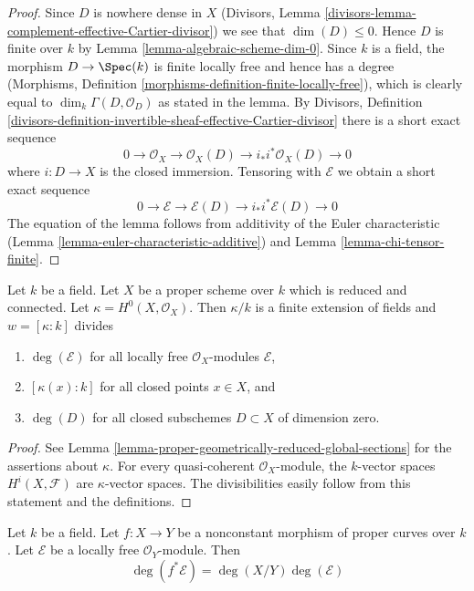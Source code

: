 \begin{proof}
Since $D$ is nowhere dense in $X$ (Divisors, Lemma
\ref{divisors-lemma-complement-effective-Cartier-divisor})
we see that $\dim(D) \leq 0$. Hence $D$ is finite over $k$
by Lemma \ref{lemma-algebraic-scheme-dim-0}. Since $k$ is a field,
the morphism $D \to \Spec(k)$ is finite locally free and hence has
a degree
(Morphisms, Definition \ref{morphisms-definition-finite-locally-free}),
which is clearly equal to $\dim_k \Gamma(D, \mathcal{O}_D)$
as stated in the lemma. By
Divisors, Definition
\ref{divisors-definition-invertible-sheaf-effective-Cartier-divisor}
there is a short exact sequence
$$
0 \to \mathcal{O}_X \to \mathcal{O}_X(D) \to i_*i^*\mathcal{O}_X(D) \to 0
$$
where $i : D \to X$ is the closed immersion. Tensoring with $\mathcal{E}$
we obtain a short exact sequence
$$
0 \to \mathcal{E} \to \mathcal{E}(D) \to i_*i^*\mathcal{E}(D) \to 0
$$
The equation of the lemma follows from additivity of
the Euler characteristic (Lemma \ref{lemma-euler-characteristic-additive})
and Lemma \ref{lemma-chi-tensor-finite}.
\end{proof}

\begin{lemma}
\label{lemma-divisible}
Let $k$ be a field. Let $X$ be a proper scheme over $k$
which is reduced and connected.
Let $\kappa = H^0(X, \mathcal{O}_X)$. Then $\kappa/k$ is a
finite extension of fields and $w = [\kappa : k]$ divides
\begin{enumerate}
\item $\deg(\mathcal{E})$ for all locally free $\mathcal{O}_X$-modules
$\mathcal{E}$,
\item $[\kappa(x) : k]$ for all closed points $x \in X$, and
\item $\deg(D)$ for all closed subschemes $D \subset X$
of dimension zero.
\end{enumerate}
\end{lemma}

\begin{proof}
See Lemma \ref{lemma-proper-geometrically-reduced-global-sections}
for the assertions about $\kappa$.
For every quasi-coherent $\mathcal{O}_X$-module, the
$k$-vector spaces $H^i(X, \mathcal{F})$ are $\kappa$-vector spaces.
The divisibilities easily follow from this statement and the
definitions.
\end{proof}

\begin{lemma}
\label{lemma-degree-pullback-map-proper-curves}
Let $k$ be a field. Let $f : X \to Y$ be a nonconstant morphism of
proper curves over $k$. Let $\mathcal{E}$ be a locally free
$\mathcal{O}_Y$-module. Then
$$
\deg(f^*\mathcal{E}) = \deg(X/Y) \deg(\mathcal{E})
$$
\end{lemma}

